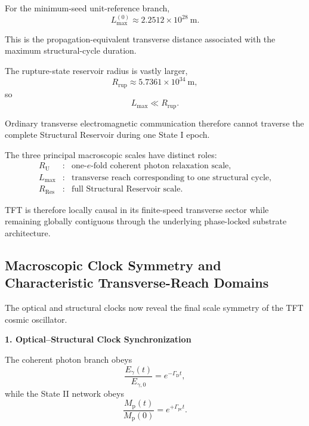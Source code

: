 For the minimum-seed unit-reference branch,
\begin{equation}
    L_{\mathrm{max}}^{(0)}
    \approx
    2.2512\times10^{28}\ \mathrm{m}.
\end{equation}

This is the propagation-equivalent transverse distance associated with the maximum structural-cycle duration.

The rupture-state reservoir radius is vastly larger,
\begin{equation}
    R_{\mathrm{rup}}
    \approx
    5.7361\times10^{34}\ \mathrm{m},
\end{equation}
so
\begin{equation}
    L_{\mathrm{max}}
    \ll
    R_{\mathrm{rup}}.
\end{equation}

Ordinary transverse electromagnetic communication therefore cannot traverse the complete Structural Reservoir during one State I epoch.

The three principal macroscopic scales have distinct roles:
\begin{equation}
\begin{array}{rcl}
    R_{\mathrm U}
    &:&
    \text{one-$e$-fold coherent photon relaxation scale},
    \\[3pt]
    L_{\mathrm{max}}
    &:&
    \text{transverse reach corresponding to one structural cycle},
    \\[3pt]
    R_{\mathrm{Res}}
    &:&
    \text{full Structural Reservoir scale}.
\end{array}
\end{equation}

TFT is therefore locally causal in its finite-speed transverse sector while remaining globally contiguous through the underlying phase-locked substrate architecture.


\subsection{Macroscopic Clock Symmetry and Characteristic Transverse-Reach Domains}

The optical and structural clocks now reveal the final scale symmetry of the TFT cosmic oscillator.


\vspace{0.5em}
\noindent\textbf{1. Optical--Structural Clock Synchronization}

The coherent photon branch obeys
\begin{equation}
    \frac{
        E_\gamma(t)
    }{
        E_{\gamma,0}
    }
    =
    e^{-\Gamma_{\mathrm D}t},
\end{equation}
while the State II network obeys
\begin{equation}
    \frac{
        M_{\mathrm p}(t)
    }{
        M_{\mathrm p}(0)
    }
    =
    e^{+\Gamma_{\mathrm{pc}}t}.
\end{equation}


